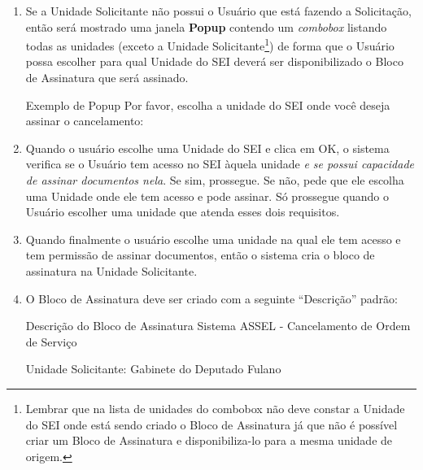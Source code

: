 \begin{enumerate}
	
	
	\item  Se a Unidade Solicitante não possui o Usuário que está fazendo a Solicitação, então será mostrado uma janela \textbf{Popup} contendo um \emph{combobox} listando todas as unidades (exceto a Unidade Solicitante\footnote{Lembrar  que na lista de unidades do combobox não deve constar a Unidade do SEI onde está sendo criado o Bloco de Assinatura já que não é possível criar um Bloco de Assinatura e disponibiliza-lo para a mesma unidade de origem.}) de forma que o Usuário possa escolher para qual Unidade do SEI deverá ser disponibilizado o Bloco de Assinatura que será assinado.
	
	\begin{env-popup}[1]{Exemplo de Popup}
		Por favor, escolha a unidade do SEI onde você deseja assinar o cancelamento:
		
		\vphantom{espaço vertical em branco}			
		
		\framebox[0.5cm][c]{$\nabla$}
		
		\vphantom{espaço vertical em branco}					
		
		
		
	\end{env-popup}	
	
	\item Quando o usuário escolhe uma Unidade do SEI e clica em OK, o sistema verifica se o Usuário tem acesso no SEI àquela unidade \emph{e se possui capacidade de assinar documentos nela}. Se sim, prossegue. Se não, pede que ele escolha uma Unidade onde ele tem acesso e pode assinar. Só prossegue quando o Usuário escolher uma unidade que atenda esses dois requisitos. 	
	
	
	\item Quando finalmente o usuário escolhe uma unidade na qual ele tem acesso e tem permissão de assinar documentos, então o sistema cria o bloco de assinatura na Unidade Solicitante.
	
	\item O Bloco de Assinatura deve ser criado com a seguinte ``Descrição'' padrão:
	
	\begin{exemplo}[1]{Descrição do Bloco de Assinatura}
		Sistema ASSEL - Cancelamento de Ordem de Serviço
		
		Unidade Solicitante: Gabinete do Deputado Fulano
		

\end{exemplo}
\end{enumerate}
